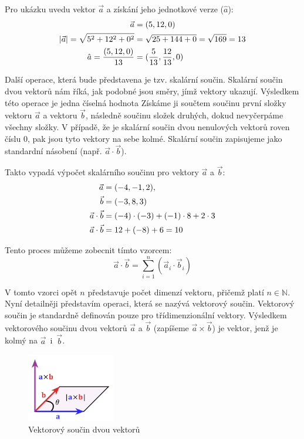 \documentclass[12pt]{article}
\begin{document}
Pro ukázku uvedu vektor $\vec{a}$ a získání jeho jednotkové verze ($\hat{a}$):
\begin{align}
    \vec{a} &= (5, 12, 0) \notag \\
    |\vec{a}| = \sqrt{5^2 + 12^2 + 0^2} &= \sqrt{25 + 144 + 0} = \sqrt{169} = 13 \notag \\
    \hat{a} = \frac{(5, 12, 0)}{13} &= (\frac{5}{13}, \frac{12}{13}, 0)
\end{align}

Další operace, která bude představena je tzv. skalární součin. Skalární součin dvou vektorů nám říká, jak podobné jsou směry, jímž vektory ukazují. Výsledkem této operace je jedna číselná hodnota Získáme ji součtem součinu první složky vektoru $\vec{a}$ a vektoru $\vec{b}$, následně součinu složek druhých, dokud nevyčerpáme všechny složky. V případě, že je skalární součin dvou nenulových vektorů roven číslu 0, pak jsou tyto vektory na sebe kolmé. Skalární součin zapisujeme jako standardní násobení (např. $\vec{a} \cdot \vec{b}$).

Takto vypadá výpočet skalárního součinu pro vektory $\vec{a}$ a $\vec{b}$:
\begin{align}
    \vec{a} &= (-4, -1, 2), \notag \\
    \vec{b} &= (-3, 8, 3) \notag \\
    \vec{a} \cdot \vec{b} &= (-4) \cdot (-3) + (-1) \cdot 8 + 2 \cdot 3 \notag \\
    \vec{a} \cdot \vec{b} &= 12 + (-8) + 6 = 10
\end{align}

Tento proces můžeme zobecnit tímto vzorcem:
\begin{equation}
    \vec{a} \cdot \vec{b} = \sum_{i=1}^{n}(\vec{a}_i \cdot \vec{b}_i)
\end{equation}

V tomto vzorci opět $n$ představuje počet dimenzí vektoru, přičemž platí $n \in \mathbb{N}$. Nyní detailněji představím operaci, která se nazývá vektorový součin. Vektorový součin je standardně definován pouze pro třídimenzionální vektory. Výsledkem vektorového součinu dvou vektorů $\vec{a}$ a $\vec{b}$ (zapíšeme $\vec{a} \times \vec{b}$) je vektor, jenž je kolmý na $\vec{a}$~i~$\vec{b}$.

\vspace{0.5cm}
\begin{figure}[h]
    \centering
    \includegraphics[height=3cm]{cross_product.png}
    \caption[Vektorový součin dvou vektorů]{Vektorový součin dvou vektorů \cite{gui_img}}
    \label{fig:Vektorový součin dvou vektorů}
\end{figure}
\end{document}
